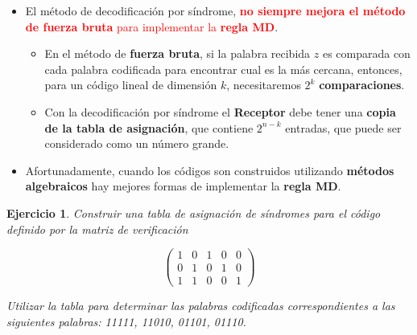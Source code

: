 \documentclass{beamer}
\theoremstyle{plain}
\theoremstyle{example}
\newtheorem{ejercicio} [Ejercicio]{Ejercicio}
\theoremstyle{example}
\begin{document}
\begin{frame}  \small  
\begin{itemize} 

\item  El método de decodificación por síndrome, \textcolor{red}{\textbf{no siempre mejora el método de fuerza bruta} para implementar la \textbf{regla MD}}. 

    \begin{itemize} 
        \item En el método de \textbf{fuerza bruta}, si la palabra recibida $z$  es comparada con cada palabra codificada para encontrar cual es la más cercana, entonces, para un código lineal de dimensión $k$, necesitaremos $2^k$ \textbf{comparaciones}. 
        \vspace{0.3cm}
        \item Con la decodificación por síndrome el \textbf{Receptor} debe tener una \textbf{copia de la tabla de asignación}, que contiene $2^{n-k}$ entradas, que puede ser considerado como un número grande.
    \end{itemize}


\item  Afortunadamente, cuando los códigos son construidos utilizando \textbf{métodos algebraicos} hay mejores formas de implementar la \textbf{regla MD}.



\end{itemize} \end{frame} 


\begin{frame}  \small \begin{ejercicio} 

Construir una tabla de asignación de síndromes para el código definido por la matriz de verificación

\[
      \left( \begin{array}{ccccc}
                  1 & 0 & 1 & 0 & 0\\
                  0 & 1 & 0 & 1 & 0\\	  
                  1 & 1 & 0 & 0 & 1
           			\end{array}
    		\right) 	    		
\]

\vspace{0.3cm}
Utilizar la tabla para determinar las palabras codificadas correspondientes a las siguientes palabras:
11111, 11010, 01101, 01110.

\end{ejercicio} 
\end{frame} 
\end{document}
